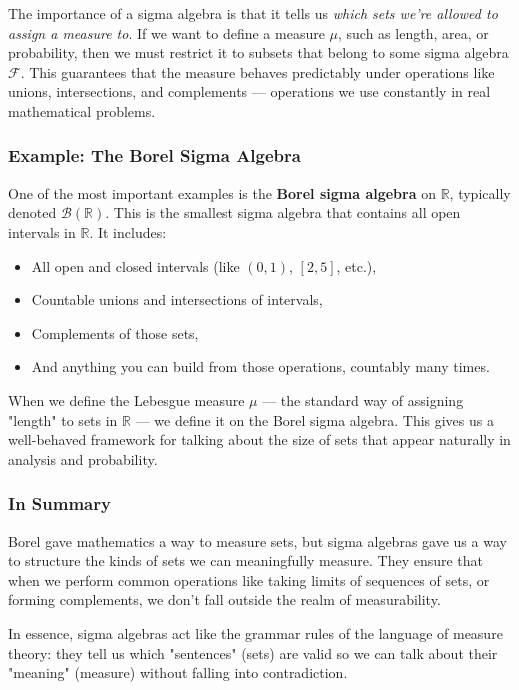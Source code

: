 The importance of a sigma algebra is that it tells us \textit{which sets we’re allowed to assign a measure to}. If we want to define a measure \( \mu \), such as length, area, or probability, then we must restrict it to subsets that belong to some sigma algebra \( \mathcal{F} \). This guarantees that the measure behaves predictably under operations like unions, intersections, and complements — operations we use constantly in real mathematical problems.

\subsubsection{Example: The Borel Sigma Algebra}

One of the most important examples is the \textbf{Borel sigma algebra} on \( \mathbb{R} \), typically denoted \( \mathcal{B}(\mathbb{R}) \). This is the smallest sigma algebra that contains all open intervals in \( \mathbb{R} \). It includes:

\begin{itemize}
    \item All open and closed intervals (like \( (0,1) \), \( [2,5] \), etc.),
    \item Countable unions and intersections of intervals,
    \item Complements of those sets,
    \item And anything you can build from those operations, countably many times.
\end{itemize}

When we define the Lebesgue measure \( \mu \) — the standard way of assigning "length" to sets in \( \mathbb{R} \) — we define it on the Borel sigma algebra. This gives us a well-behaved framework for talking about the size of sets that appear naturally in analysis and probability.

\subsubsection{In Summary}

Borel gave mathematics a way to measure sets, but sigma algebras gave us a way to structure the kinds of sets we can meaningfully measure. They ensure that when we perform common operations like taking limits of sequences of sets, or forming complements, we don’t fall outside the realm of measurability.

In essence, sigma algebras act like the grammar rules of the language of measure theory: they tell us which "sentences" (sets) are valid so we can talk about their "meaning" (measure) without falling into contradiction.



